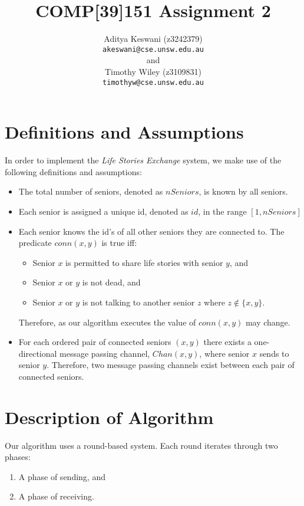 \documentclass[12pt,a4paper]{scrartcl}
\begin{document}
\title{COMP[39]151 Assignment 2}
\author{Aditya Keswani (z3242379) \\ 
        \texttt{akeswani@cse.unsw.edu.au} \\ 
        and \\ 
        Timothy Wiley (z3109831) \\
        \texttt{timothyw@cse.unsw.edu.au} }

\maketitle

\tableofcontents

\section{Definitions and Assumptions}
In order to implement the \emph{Life Stories Exchange} system, we make use of the following definitions and assumptions:
\begin{itemize}
    \item The total number of seniors, denoted as $nSeniors$, is known by all seniors.
    \item Each senior is assigned a unique id, denoted as $id$, in the range $[1,nSeniors]$
    \item Each senior knows the id's of all other seniors they are connected to.
          The predicate $conn(x,y)$ is true iff:
          \begin{itemize}
              \item Senior $x$ is permitted to share life stories with senior $y$, and
              \item Senior $x$ or $y$ is not dead, and
              \item Senior $x$ or $y$ is not talking to another senior $z$ where $z \notin \{x,y\}$.
          \end{itemize}
          Therefore, as our algorithm executes the value of $conn(x,y)$ may change.
    \item For each ordered pair of connected seniors $(x,y)$ there exists a one-directional message passing channel, $Chan(x,y)$, where senior $x$ sends to senior $y$.
          Therefore, two message passing channels exist between each pair of connected seniors.
\end{itemize}

\section{Description of Algorithm}
Our algorithm uses a round-based system.
Each round iterates through two phases:
\begin{enumerate}
    \item A phase of sending, and
    \item A phase of receiving.
\end{enumerate}
\end{document}
